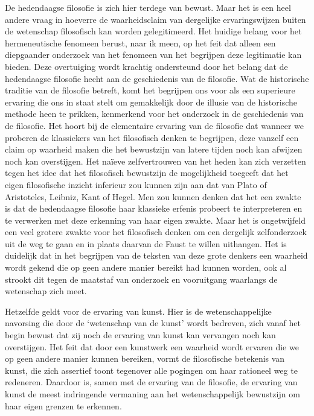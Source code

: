 De hedendaagse filosofie is zich hier terdege van bewust. Maar het is een heel andere vraag in hoeverre de waarheidsclaim van dergelijke ervaringswijzen buiten de wetenschap filosofisch kan worden gelegitimeerd. Het huidige belang voor het hermeneutische fenomeen berust, naar ik meen, op het feit dat alleen een diepgaander onderzoek van het fenomeen van het begrijpen deze legitimatie kan bieden. Deze overtuiging wordt krachtig ondersteund door het belang dat de hedendaagse filosofie hecht aan de geschiedenis van de filosofie. Wat de historische traditie van de filosofie betreft, komt het begrijpen ons voor als een superieure ervaring die ons in staat stelt om gemakkelijk door de illusie van de historische methode heen te prikken, kenmerkend voor het onderzoek in de geschiedenis van de filosofie. Het hoort bij de elementaire ervaring van de filosofie dat wanneer we proberen de klassiekers van het filosofisch denken te begrijpen, deze vanzelf een claim op waarheid maken die het bewustzijn van latere tijden noch kan afwijzen noch kan overstijgen. Het naïeve zelfvertrouwen van het heden kan zich verzetten tegen het idee dat het filosofisch bewustzijn de mogelijkheid toegeeft dat het eigen filosofische inzicht inferieur zou kunnen zijn aan dat van Plato of Aristoteles, Leibniz, Kant of Hegel. Men zou kunnen denken dat het een zwakte is dat de hedendaagse filosofie haar klassieke erfenis probeert te interpreteren en te verwerken met deze erkenning van haar eigen zwakte. Maar het is ongetwijfeld een veel grotere zwakte voor het filosofisch denken om een dergelijk zelfonderzoek uit de weg te gaan en in plaats daarvan de Faust te willen uithangen. Het is duidelijk dat in het begrijpen van de teksten van deze grote denkers een waarheid wordt gekend die op geen andere manier bereikt had kunnen worden, ook al strookt dit tegen de maatstaf van onderzoek en vooruitgang waarlangs de wetenschap zich meet.

Hetzelfde geldt voor de ervaring van kunst. Hier is de wetenschappelijke navorsing die door de ‘wetenschap van de kunst’ wordt bedreven, zich vanaf het begin bewust dat zij noch de ervaring van kunst kan vervangen noch kan overstijgen. Het feit dat door een kunstwerk een waarheid wordt ervaren die we op geen andere manier kunnen bereiken, vormt de filosofische betekenis van kunst, die zich assertief toont tegenover alle pogingen om haar rationeel weg te redeneren. Daardoor is, samen met de ervaring van de filosofie, de ervaring van kunst de meest indringende vermaning aan het wetenschappelijk bewustzijn om haar eigen grenzen te erkennen.


